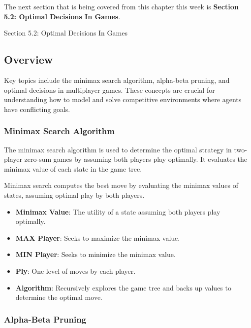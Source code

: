 The next section that is being covered from this chapter this week is \textbf{Section 5.2: Optimal Decisions In Games}.

\begin{notes}{Section 5.2: Optimal Decisions In Games}    
    \subsection*{Overview}
    
    Key topics include the minimax search algorithm, alpha-beta pruning, and optimal decisions in multiplayer games. These concepts are crucial for understanding how to model and solve competitive 
    environments where agents have conflicting goals.
    
    \subsubsection*{Minimax Search Algorithm}
    
    The minimax search algorithm is used to determine the optimal strategy in two-player zero-sum games by assuming both players play optimally. It evaluates the minimax value of each state in the game tree.
    
    \begin{highlight}
        Minimax search computes the best move by evaluating the minimax values of states, assuming optimal play by both players.
        
        \begin{itemize}
            \item \textbf{Minimax Value}: The utility of a state assuming both players play optimally.
            \item \textbf{MAX Player}: Seeks to maximize the minimax value.
            \item \textbf{MIN Player}: Seeks to minimize the minimax value.
            \item \textbf{Ply}: One level of moves by each player.
            \item \textbf{Algorithm}: Recursively explores the game tree and backs up values to determine the optimal move.
        \end{itemize}
    \end{highlight}
    
    \subsubsection*{Alpha-Beta Pruning}
    

\end{notes}

